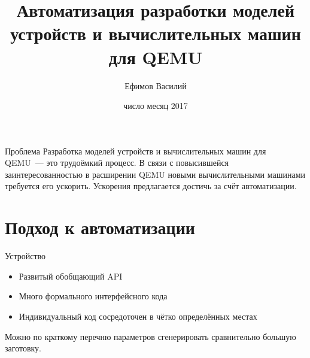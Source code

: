 \documentclass[unicode,hyperref={unicode=true}]{beamer}
\title[]
{Автоматизация разработки моделей устройств и вычислительных машин для QEMU}
\author[]{Ефимов Василий}
\institute[]{ИСП РАН}
\date[]{число месяц  2017}
\newcommand*{\sectionpagekb}{\usebeamertemplate*{section page kb}}
\theoremstyle{definition}
\theoremstyle{plain}
\begin{document}
\begin{frame}
\titlepage
\end{frame}



\begin{frame}{Проблема}
Разработка моделей устройств и вычислительных машин для QEMU~--- это трудоёмкий
процесс. В связи с повысившейся заинтересованностью в расширении QEMU новыми
вычислительными машинами требуется его ускорить. Ускорения предлагается достичь
за счёт автоматизации.
\end{frame}






\section{Подход к автоматизации}
\frame{\sectionpagekb}



\begin{frame}{Устройство}

\begin{itemize}
\item Развитый обобщающий API
\item Много формального интерфейсного кода
\item Индивидуальный код сосредоточен в чётко определённых местах
\end{itemize}

\begin{center}
Можно по краткому перечню параметров сгенерировать сравнительно большую
заготовку.
\end{center}

\end{frame}
\end{document}

